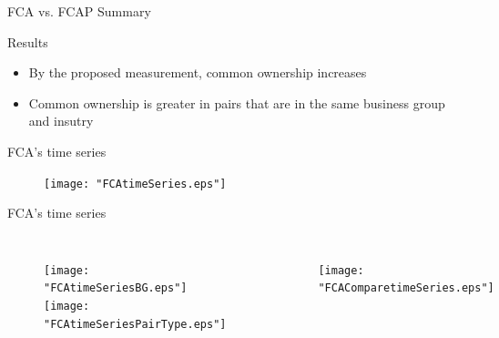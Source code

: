 \documentclass{beamer}
\begin{document}
	
	
	
	\begin{frame}{FCA vs. FCAP Summary}
		\begin{table}[htbp]
			\centering
			\resizebox{0.8\textwidth}{!}
			{
				  }          
		\end{table}%
		\begin{block}{Results}
			\small
			\begin{itemize}
				\item By the proposed measurement, common ownership increases
				\item Common ownership is greater in pairs that  are in the same business group and insutry
			\end{itemize}
		\end{block}
	\end{frame}
	
	\begin{frame}{FCA's time series}
		\begin{figure}
			\centering  
			\texttt{[image: "FCAtimeSeries.eps"]}
			
		\end{figure} 
	\end{frame}

	\begin{frame}{FCA's time series}
		\begin{columns}
			\begin{figure}
				\centering  
				\texttt{[image: "FCAtimeSeriesBG.eps"]}
				\texttt{[image: "FCAtimeSeriesPairType.eps"]}
			\end{figure}    
			\begin{figure}
				\centering  
				\texttt{[image: "FCAComparetimeSeries.eps"]}
			\end{figure}
          
		\end{columns}

\end{frame}
\end{document}
